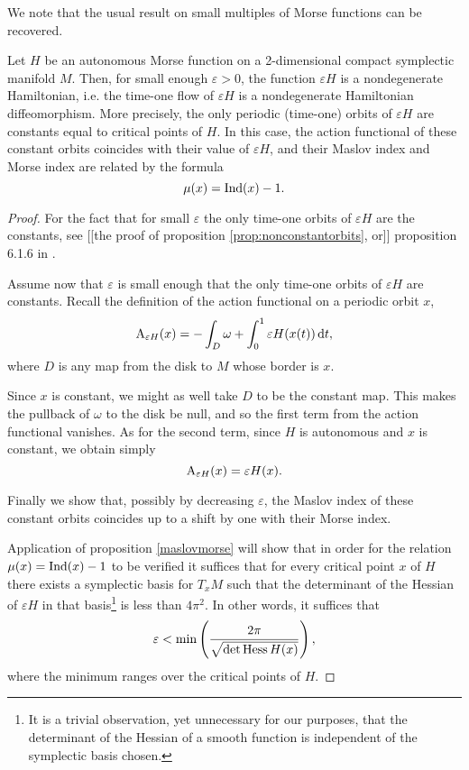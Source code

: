 We note that the usual result on small multiples of Morse functions can be recovered.

\begin{corollary}
Let $H$ be an autonomous Morse function on a 2-dimensional compact symplectic manifold $M$. Then, for small enough $\varepsilon > 0$, the function $\varepsilon H$ is a nondegenerate Hamiltonian, i.e. the time-one flow of $\varepsilon H$ is a nondegenerate Hamiltonian diffeomorphism. More precisely, the only periodic (time-one) orbits of $\varepsilon H$ are constants equal to critical points of $H$. In this case, the action functional of these constant orbits coincides with their value of $\varepsilon H$, and their Maslov index and Morse index are related by the formula
\begin{equation}
\mu(x) = \Ind(x) - 1.
\end{equation}
\end{corollary}

\begin{proof}
For the fact that for small $\varepsilon$ the only time-one orbits of $\varepsilon H$ are the constants, see [[the proof of proposition \ref{prop:nonconstantorbits}, or]] proposition 6.1.6 in \cite{audin}.

Assume now that $\varepsilon$ is small enough that the only time-one orbits of $\varepsilon H$ are constants. Recall the definition of the action functional on a periodic orbit $x$,
\begin{equation}
\AA_{\varepsilon H}(x) = - \int_D \omega + \int_0^1 \varepsilon H(x(t)) \dl t,
\end{equation}
where $D$ is any map from the disk to $M$ whose border is $x$.

Since $x$ is constant, we might as well take $D$ to be the constant map. This makes the pullback of $\omega$ to the disk be null, and so the first term from the action functional vanishes. As for the second term, since $H$ is autonomous and $x$ is constant, we obtain simply
\begin{equation}
\AA_{\varepsilon H}(x) = \varepsilon H(x).
\end{equation}

Finally we show that, possibly by decreasing $\varepsilon$, the Maslov index of these constant orbits coincides up to a shift by one with their Morse index.

Application of proposition \ref{maslovmorse} will show that in order for the relation $\mu(x) = \Ind(x) - 1$ to be verified it suffices that for every critical point $x$ of $H$ there exists a symplectic basis for $T_x M$ such that the determinant of the Hessian of $\varepsilon H$ in that basis\footnote{It is a trivial observation, yet unnecessary for our purposes, that the determinant of the Hessian of a smooth function is independent of the symplectic basis chosen.} is less than $4 \pi^2$. In other words, it suffices that
\begin{equation}
\varepsilon < \min \left( \frac{2\pi}{\sqrt{\det \hessian H(x)}}\right),
\end{equation}
where the minimum ranges over the critical points of $H$.
\end{proof}

